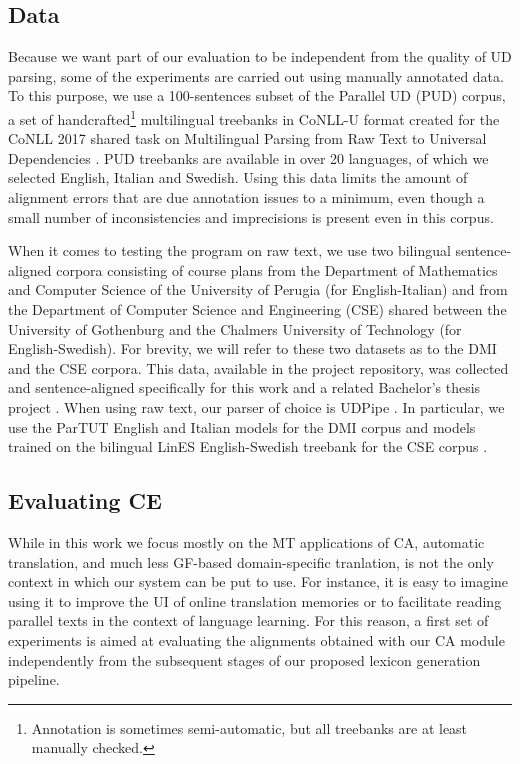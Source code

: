 \documentclass[11pt]{article}
\begin{document}
\subsection{Data}
Because we want part of our evaluation to be independent from the quality of UD parsing, some of the experiments are carried out using manually annotated data. 
To this purpose, we use a 100-sentences subset of the Parallel UD (PUD) corpus, a set of handcrafted\footnote{Annotation is sometimes semi-automatic, but all treebanks are at least manually checked.} multilingual treebanks in CoNLL-U format created for the CoNLL 2017 shared task on Multilingual Parsing from Raw Text to Universal Dependencies \cite{TODO:}.
PUD treebanks are available in over 20 languages, of which we selected English, Italian and Swedish. 
Using this data limits the amount of alignment errors that are due annotation issues to a minimum, even though a small number of inconsistencies and imprecisions is present even in this corpus.

When it comes to testing the program on raw text, we use two bilingual sentence-aligned corpora consisting of course plans from the Department of Mathematics and Computer Science of the University of Perugia (for English-Italian) and from the Department of Computer Science and Engineering (CSE) shared between the University of Gothenburg and the Chalmers University of Technology (for English-Swedish). For brevity, we will refer to these two datasets as to the DMI and the CSE corpora.
This data, available in the project repository, was collected and sentence-aligned specifically for this work and a related Bachelor's thesis project \cite{TODO:}.
When using raw text, our parser of choice is UDPipe \cite{TODO:}. 
In particular, we use the ParTUT English and Italian models for the DMI corpus and models trained on the bilingual LinES English-Swedish treebank for the CSE corpus \cite{TODO:}.


\subsection{Evaluating CE} %
While in this work we focus mostly on the MT applications of CA, automatic translation, and much less GF-based domain-specific tranlation, is not the only context in which our system can be put to use. 
For instance, it is easy to imagine using it to improve the UI of online translation memories or to facilitate reading parallel texts in the context of language learning.
For this reason, a first set of experiments is aimed at evaluating the alignments obtained with our CA module independently from the subsequent stages of our proposed lexicon generation pipeline.
\end{document}
